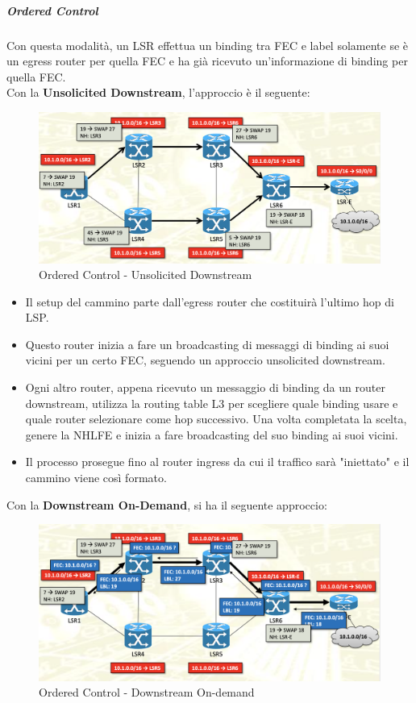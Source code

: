 \documentclass{article}
\begin{document}
\subparagraph{Ordered Control} Con questa modalità, un LSR effettua un binding tra FEC e label solamente se è un egress router per quella FEC e ha già ricevuto un'informazione di binding per quella FEC. \\
Con la \textbf{Unsolicited Downstream}, l'approccio è il seguente: 
\begin{figure}[H]
    \centering
    \includegraphics[scale=0.4]{figures/ordered control unsolicited downstream.png}
    \caption{Ordered Control - Unsolicited Downstream}
\end{figure}
\begin{itemize}
    \item Il setup del cammino parte dall'egress router che costituirà l'ultimo hop di LSP.
    \item Questo router inizia a fare un broadcasting di messaggi di binding ai suoi vicini per un certo FEC, seguendo un approccio unsolicited downstream.
    \item Ogni altro router, appena ricevuto un messaggio di binding da un router downstream, utilizza la routing table L3 per scegliere quale binding usare e quale router selezionare come hop successivo. Una volta completata la scelta, genere la NHLFE e inizia a fare broadcasting del suo binding ai suoi vicini.
    \item Il processo prosegue fino al router ingress da cui il traffico sarà "iniettato" e il cammino viene così formato.
\end{itemize}
Con la \textbf{Downstream On-Demand}, si ha il seguente approccio:
\begin{figure}[H]
    \centering
    \includegraphics[scale=0.4]{figures/ordered control downstream on-demand.png}
    \caption{Ordered Control - Downstream On-demand}
\end{figure}
\end{document}

